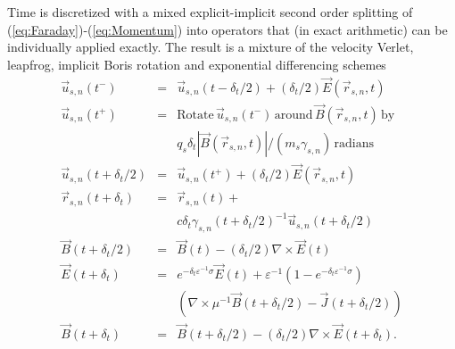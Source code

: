 \documentclass[journal,twoside]{IEEEtran}
\newcommand{\eps}{\varepsilon}
\newcommand{\vecr}{\vec{r}}
\newcommand{\vecu}{\vec{u}}
\newcommand{\vecJ}{\vec{J}}
\newcommand{\vecE}{\vec{E}}
\newcommand{\vecB}{\vec{B}}
\newcommand{\Curl}[1]{\nabla \times #1}
\newcommand{\eq}[1]{(\ref{eq:#1})}
\begin{document}
Time is discretized with a mixed explicit-implicit second order
splitting of \eq{Faraday}-\eq{Momentum} into operators that (in exact
arithmetic) can be individually applied exactly.  The result is a
mixture of the velocity Verlet, leapfrog, implicit Boris rotation and
exponential differencing schemes
\begin{eqnarray*}
\vecu_{s,n}\left(t^-\right) &=&\vecu_{s,n}\left(t-\delta_t/2\right) +
  \left(\delta_t/2\right)\vecE\left(\vecr_{s,n},t\right) \\
\vecu_{s,n}\left(t^+\right) &=&
  \textrm{Rotate}\,\vecu_{s,n}\left(t^-\right)\,\textrm{around}\,
  \vecB\left(\vecr_{s,n},t\right)\,\textrm{by}\\&&
  q_s\delta_t\left|\vecB\left(\vecr_{s,n},t\right)\right| /
  \left(m_s\gamma_{s,n}\right)\,\textrm{radians} \\
\vecu_{s,n}\left(t+\delta_t/2\right) &=&\vecu_{s,n}\left(t^+\right) +
  \left(\delta_t/2\right)\vecE\left(\vecr_{s,n},t\right) \\
\vecr_{s,n}\left(t+\delta_t\right) &=& \vecr_{s,n}\left(t\right) +\\&&
  c\delta_t\gamma_{s,n}\left(t+\delta_t/2\right)^{-1}
           \vecu_{s,n}\left(t+\delta_t/2\right) \\
\vecB\left(t+\delta_t/2\right) &=&
  \vecB\left(t\right) -
  \left(\delta_t/2\right)\Curl{\vecE\left(t\right)} \\
\vecE\left(t+\delta_t\right) &=&
  e^{-\delta_t\eps^{-1}\sigma}\vecE\left(t\right) + 
  \eps^{-1}\left(1-e^{-\delta_t\eps^{-1}\sigma}\right) \\
&&\left( \Curl{\mu^{-1}\vecB\left(t+\delta_t/2\right)} -
         \vecJ\left(t+\delta_t/2\right) \right) \\
\vecB\left(t+\delta_t\right) &=& \vecB\left(t+\delta_t/2\right) -
  \left(\delta_t/2\right)\Curl{\vecE\left(t+\delta_t\right)}
.
\end{eqnarray*}
\end{document}
